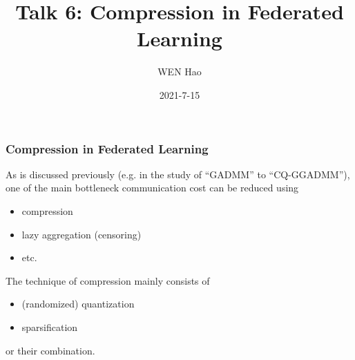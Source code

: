 \usepackage{nccmath}




\title[Compression]{Talk 6: Compression in Federated Learning}
\date{2021-7-15}
\author[]{WEN Hao}




\setlength{\belowdisplayskip}{5pt} \setlength{\belowdisplayshortskip}{5pt}
\setlength{\abovedisplayskip}{5pt} \setlength{\abovedisplayshortskip}{5pt}


\begin{frame}
\titlepage %
\end{frame}


\begin{frame}
\frametitle{Compression in Federated Learning}

As is discussed previously (e.g. in the study of ``GADMM'' to ``CQ-GGADMM''), one of the main bottleneck {\color{red} communication cost} can be reduced using
\begin{itemize}
    \item compression
    \item {lazy aggregation (censoring)}
    \item {etc.}
\end{itemize}

\pause
\vspace{0.6em}

The technique of compression mainly consists of
\begin{itemize}
    \item (randomized) quantization
    \item sparsification
\end{itemize}
or their combination.

\end{frame}


